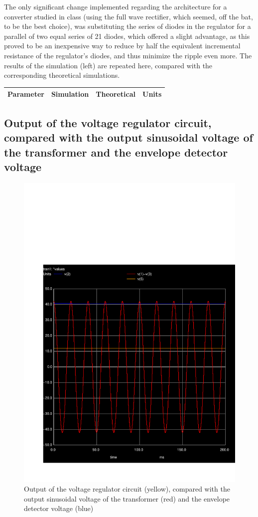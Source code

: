 The only significant change implemented regarding the architecture for a converter studied in class (using the full wave rectifier, which seemed, off the bat, to be the best choice), was substituting the series of diodes in the regulator for a parallel of two equal series of 21 diodes, which offered a slight advantage, as this proved to be an inexpensive way to reduce by half the equivalent incremental resistance of the regulator's diodes, and thus minimize the ripple even more. The results of the simulation (left) are repeated here, compared with the corresponding theoretical simulations.
 
\hfill
 \parbox{1\linewidth}{
  \centering
  \begin{tabular}{|l|l|l|r|}
    \hline    
    {\bf Parameter} & {\bf Simulation} & {\bf Theoretical } & {\bf Units }\\ \hline
    
  \end{tabular}
  \label{tab:results}
  }


  
\subsection{Output of the voltage regulator circuit, compared with the output sinusoidal voltage of the transformer and the envelope detector voltage}

\par
\begin{figure}[H] \centering
\includegraphics[width=0.6\linewidth]{vs_vout_venv.pdf}
\caption{Output of the voltage regulator circuit (yellow), compared with the output sinusoidal voltage of the transformer (red) and the envelope detector voltage (blue)}
\label{fig:vs_venv_vout}
\end{figure}


